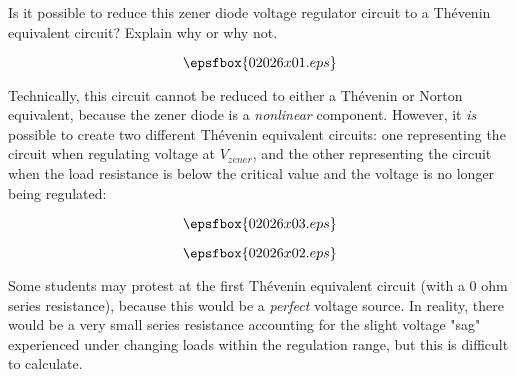 

Is it possible to reduce this zener diode voltage regulator circuit to a Th\'evenin equivalent circuit?  Explain why or why not.

$$\epsfbox{02026x01.eps}$$







Technically, this circuit cannot be reduced to either a Th\'evenin or Norton equivalent, because the zener diode is a {\it nonlinear} component.  However, it {\it is} possible to create two different Th\'evenin equivalent circuits: one representing the circuit when regulating voltage at $V_{zener}$, and the other representing the circuit when the load resistance is below the critical value and the voltage is no longer being regulated:

$$\epsfbox{02026x03.eps}$$

$$\epsfbox{02026x02.eps}$$







Some students may protest at the first Th\'evenin equivalent circuit (with a 0 ohm series resistance), because this would be a {\it perfect} voltage source.  In reality, there would be a very small series resistance accounting for the slight voltage "sag" experienced under changing loads within the regulation range, but this is difficult to calculate.




